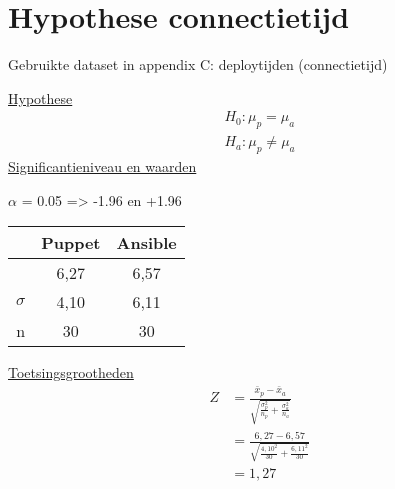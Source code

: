 \section*{Hypothese connectietijd}
\label{wis:hypotheseconnectietijd}

Gebruikte dataset in appendix C: deploytijden (connectietijd) %

\underline{Hypothese}
\begin{align*}
H_0:  \mu_p = \mu_a \\
H_a: \mu_p\neq \mu_a 
\end{align*}
\underline{Significantieniveau en waarden} 

 $\alpha$ = 0.05 => -1.96 en +1.96 \newline

		\begin{tabular}{ r |c |c }
			& Puppet & Ansible\\\hline
			\unexpanded{$ \bar x  $} &  6,27 & 6,57\\ \hline
			$\sigma$ & 4,10 & 6,11\\ \hline
			n &  30 &  30

\end{tabular}


\underline{Toetsingsgrootheden}
\begin{equation} \label{eq1}
\begin{split}
Z &= \tfrac{\bar x_p - \bar x_a}{\sqrt{\tfrac{\sigma_p^2}{n_p}+\tfrac{\sigma_a^2}{n_a}}}\\
& = \tfrac{ 6,27 - 6,57}{\sqrt{\tfrac{ 4,10 ^2}{30}+\tfrac{ 6,11^2}{30}}} \\
& = 1,27
\end{split}
\end{equation}
